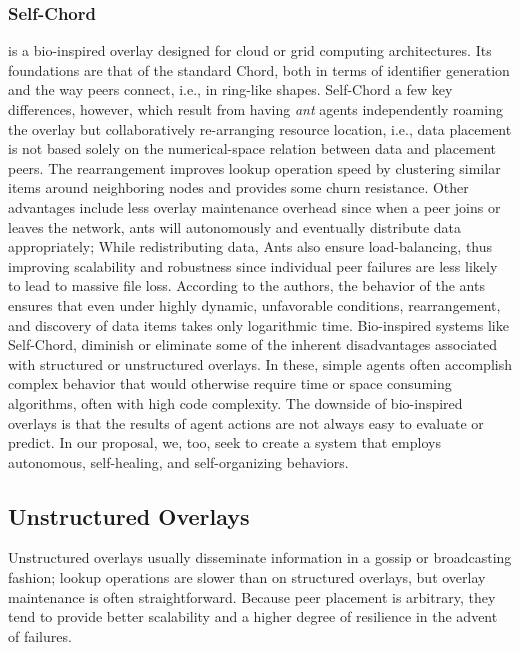 \documentclass[runningheads]{llncs}
\begin{document}
\subsubsection{Self-Chord}\cite{selfchord} is a bio-inspired overlay designed for cloud or grid computing architectures. Its foundations are that of the standard Chord, both in terms of identifier generation and the way peers connect, i.e., in ring-like shapes. Self-Chord a few key differences, however, which result from having \textit{ant} agents independently roaming the overlay but collaboratively re-arranging resource location, i.e., data placement is not based solely on the numerical-space relation between data and placement peers. The rearrangement improves lookup operation speed by clustering similar items around neighboring nodes and provides some churn resistance. Other advantages include less overlay maintenance overhead since when a peer joins or leaves the network, ants will autonomously and eventually distribute data appropriately; While redistributing data, Ants also ensure load-balancing, thus improving scalability and robustness since individual peer failures are less likely to lead to massive file loss. According to the authors, the behavior of the ants ensures that even under highly dynamic, unfavorable conditions, rearrangement, and discovery of data items takes only logarithmic time. Bio-inspired systems like Self-Chord, diminish or eliminate some of the inherent disadvantages associated with structured or unstructured overlays. In these, simple agents often accomplish complex behavior that would otherwise require time or space consuming algorithms, often with high code complexity. The downside of bio-inspired overlays is that the results of agent actions are not always easy to evaluate or predict. In our proposal, we, too, seek to create a system that employs autonomous, self-healing, and self-organizing behaviors.

\subsection{Unstructured Overlays}
Unstructured overlays usually disseminate information in a gossip or broadcasting fashion; lookup operations are slower than on structured overlays, but overlay maintenance is often straightforward. Because peer placement is arbitrary, they tend to provide better scalability and a higher degree of resilience in the advent of failures.
\end{document}
